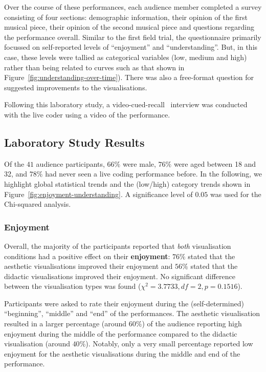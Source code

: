 \documentclass{sig-alternate}
\begin{document}
Over the course of these performances, each audience member completed
a survey consisting of four sections: demographic information, their
opinion of the first musical piece, their opinion of the second
musical piece and questions regarding the performance overall. Similar
to the first field trial, the questionnaire primarily focussed on
self-reported levels of ``enjoyment'' and ``understanding''. But, in
this case, these levels were tallied as categorical variables (low,
medium and high) rather than being related to curves such as that
shown in Figure~\ref{fig:understanding-over-time}). There was also a
free-format question for suggested improvements to the visualisations.

Following this laboratory study, a
video-cued-recall~\cite{Suchman:1992tk} interview was conducted with
the live coder using a video of the performance.

\subsection{Laboratory Study Results}

Of the $41$ audience participants, $66\%$ were male, $76\%$ were aged
between 18 and 32, and $78\%$ had never seen a live coding performance
before. In the following, we highlight global statistical trends and
the (low/high) category trends shown in
Figure~\ref{fig:enjoyment-understanding}. A significance level of
$0.05$ was used for the Chi-squared analysis.

\subsubsection{Enjoyment}

Overall, the majority of the participants reported that \emph{both}
visualisation conditions had a positive effect on their
\textbf{enjoyment}: $76\%$ stated that the aesthetic visualisations
improved their enjoyment and $56\%$ stated that the didactic
visualisations improved their enjoyment. No significant difference
between the visualisation types  was found
($\chi^2=3.7733,df=2,p=0.1516$).

Participants were asked to rate their enjoyment during the
(self-determined) ``beginning'', ``middle'' and ``end'' of the
performances. The aesthetic visualisation resulted in a larger
percentage (around $60\%$) of the audience reporting high enjoyment
during the middle of the performance compared to the didactic
visualisation (around $40\%$). Notably, only a very small percentage
reported low enjoyment for the aesthetic visualisations during the
middle and end of the performance.
\end{document}

